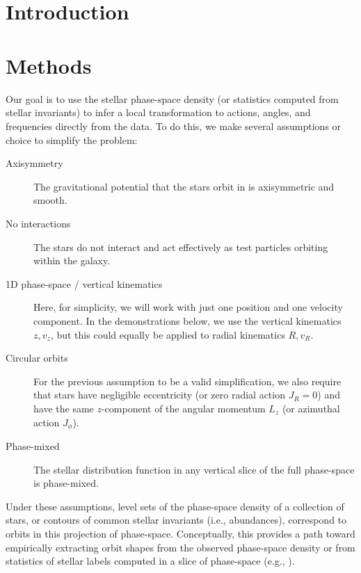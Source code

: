 
\section*{~}\clearpage

\section{Introduction} \label{sec:intro}


\section{Methods} \label{sec:methods}

Our goal is to use the stellar phase-space density (or statistics computed from stellar
invariants) to infer a local transformation to actions, angles, and frequencies directly
from the data.
To do this, we make several assumptions or choice to simplify the problem:
\begin{description}
    \item[Axisymmetry] The gravitational potential that the stars orbit in is
    axisymmetric and smooth.
    \item[No interactions] The stars do not interact and act effectively as test
    particles orbiting within the galaxy.
    \item[1D phase-space / vertical kinematics] Here, for simplicity, we will work with
    just one position and one velocity component. In the demonstrations below, we use
    the vertical kinematics $z, v_z$, but this could equally be applied to radial
    kinematics $R, v_R$.
    \item[Circular orbits] For the previous assumption to be a valid simplification, we
    also require that stars have negligible eccentricity (or zero radial action $J_R=0$)
    and have the same $z$-component of the angular momentum $L_z$ (or azimuthal action
    $J_\phi$).
    \item[Phase-mixed] The stellar distribution function in any vertical slice of
    the full phase-space is phase-mixed.
\end{description}
Under these assumptions, level sets of the phase-space density of a collection of stars,
or contours of common stellar invariants (i.e., abundances), correspond to orbits in
this projection of phase-space.
Conceptually, this provides a path toward empirically extracting orbit shapes from the
observed phase-space density or from statistics of stellar labels computed in a slice of
phase-space (e.g., \citealt{Price-Whelan:2021}).

